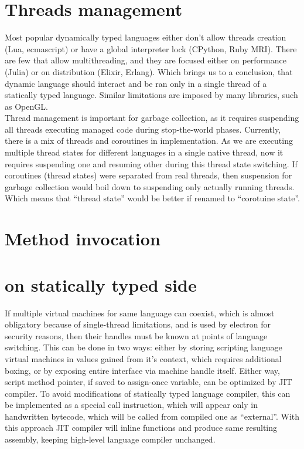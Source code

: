 \documentclass[times,specification,annotation]{itmo-student-thesis}
\begin{document}
\section{Threads management} \label{sec:thread-management}
Most popular dynamically typed languages either don't allow threads creation (Lua, ecmascript) or have a global interpreter lock (CPython, Ruby MRI). There are few that allow multithreading, and they are focused either on performance (Julia) or on distribution (Elixir, Erlang). Which brings us to a conclusion, that dynamic language should interact and be ran only in a single thread of a statically typed language. Similar limitations are imposed by many libraries, such as OpenGL.\\
Thread management is important for garbage collection, as it requires suspending all threads executing managed code during stop-the-world phases. Currently, there is a mix of threads and coroutines in implementation. As we are executing multiple thread states for different languages in a single native thread, now it requires suspending one and resuming other during this thread state switching. If coroutines (thread states) were separated from real threads, then suspension for garbage collection would boil down to suspending only actually running threads. Which means that ``thread state'' would be better if renamed to ``corotuine state''.

\section{Method invocation}

\section{on statically typed side}
If multiple virtual machines for same language can coexist, which is almost obligatory because of single-thread limitations, and is used by electron for security reasons, then their handles must be known at points of language switching. This can be done in two ways: either by storing scripting language virtual machines in values gained from it's context, which requires additional boxing, or by exposing entire interface via machine handle itself. Either way, script method pointer, if saved to assign-once variable, can be optimized by JIT compiler. To avoid modifications of statically typed language compiler, this can be implemented as a special call instruction, which will appear only in handwritten bytecode, which will be called from compiled one as ``external''. With this approach JIT compiler will inline functions and produce same resulting assembly, keeping high-level language compiler unchanged.
\end{document}
